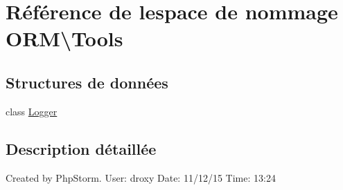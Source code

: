 \hypertarget{namespace_o_r_m_1_1_tools}{}\section{Référence de l\textquotesingle{}espace de nommage O\+RM\textbackslash{}Tools}
\label{namespace_o_r_m_1_1_tools}
\subsection*{Structures de données}
\begin{DoxyCompactItemize}
\item 
class \hyperlink{class_o_r_m_1_1_tools_1_1_logger}{Logger}
\end{DoxyCompactItemize}


\subsection{Description détaillée}
Created by Php\+Storm. User\+: droxy Date\+: 11/12/15 Time\+: 13\+:24 